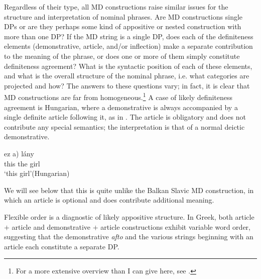 \documentclass[output=paper,
colorlinks,
citecolor=brown,
newtxmath
]{langscibook}
\begin{document}
Regardless of their type, all MD constructions raise similar issues for the structure and interpretation of nominal phrases. Are MD constructions single DPs or are they perhaps some kind of appositive or nested construction with more than one DP? If the MD string is a single DP, does each of the definiteness elements (demonstrative, article, and/or inflection) make a separate contribution to the meaning of the phrase, or does one or more of them simply constitute definiteness agreement? What is the syntactic position of each of these elements, and what is the overall structure of the nominal phrase, i.e. what categories are projected and how? The answers to these questions vary; in fact, it is clear that MD constructions are far from homogeneous.\footnote{For a more extensive overview than I can give here, see \cite{Alexiadou2014}.} A case of likely definiteness agreement is Hungarian, where a demonstrative is always accompanied by a single definite article following it, as in . The  article is obligatory and does not contribute any special semantics; the interpretation is that of a normal deictic demonstrative.

\ea \label{ex:girl}
\gll ez \minsp{*(} a) lány\\
     this {} the girl\\
\glt `this girl'\hfill (Hungarian)
\z

\noindent We will see below that this is quite unlike the Balkan Slavic MD construction, in which an article is optional and does contribute additional meaning.

Flexible order is a diagnostic of likely appositive structure. In Greek, both article $+$ article  and demonstrative $+$ article  constructions exhibit variable word order, suggesting that the demonstrative \textit{afto} and the various strings beginning with an article each constitute a separate DP.

\end{document}
